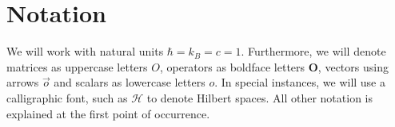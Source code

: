     \chapter*{Notation}
    We will work with natural units $\hbar = k_B = c = 1$. Furthermore, we will denote matrices as uppercase letters $O$, operators as boldface letters $\mathbf{O}$, vectors using arrows $\Vec{o}$ and scalars as lowercase letters $o$. In special instances, we will use a calligraphic font, such as $\mathcal{H}$ to denote Hilbert spaces. All other notation is explained at the first point of occurrence.

\endgroup
